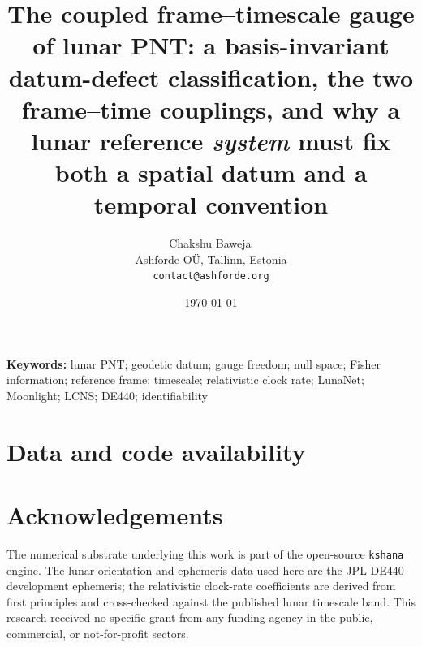 \documentclass[11pt]{article}
\title{\textbf{The coupled frame--timescale gauge of lunar PNT: a
basis-invariant datum-defect classification, the two frame--time couplings,
and why a lunar reference \emph{system} must fix both a spatial datum and a
temporal convention}}
\author{Chakshu Baweja\,\orcidlink{0009-0008-2098-0751}\\
\small Ashforde O\"U, Tallinn, Estonia \\
\small \texttt{contact@ashforde.org}}
\date{\today}
\theoremstyle{definition}
\newcommand{\code}[1]{\texttt{#1}}
\begin{document}
\maketitle

\begin{abstract}

\end{abstract}

\noindent\textbf{Keywords:} lunar PNT; geodetic datum; gauge freedom; null space;
Fisher information; reference frame; timescale; relativistic clock rate; LunaNet;
Moonlight; LCNS; DE440; identifiability

\vspace{0.5em}









\section*{Data and code availability}


\section*{Acknowledgements}
The numerical substrate underlying this work is part of the open-source
\code{kshana} engine. The lunar orientation and ephemeris data used here are the
JPL DE440 development ephemeris; the relativistic clock-rate coefficients are
derived from first principles and cross-checked against the published lunar
timescale band. This research received no specific grant from any funding agency
in the public, commercial, or not-for-profit sectors.




\appendix

\end{document}

